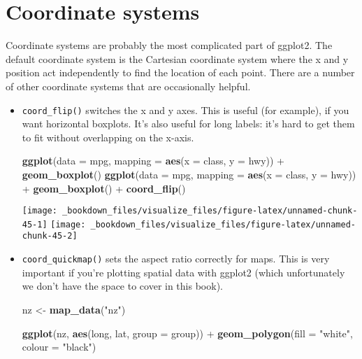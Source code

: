 \documentclass[]{book}
\newenvironment{Shaded}{\begin{snugshade}}{\end{snugshade}}
\newcommand{\KeywordTok}[1]{\textcolor[rgb]{0.13,0.29,0.53}{\textbf{{#1}}}}
\newcommand{\DataTypeTok}[1]{\textcolor[rgb]{0.13,0.29,0.53}{{#1}}}
\newcommand{\StringTok}[1]{\textcolor[rgb]{0.31,0.60,0.02}{{#1}}}
\newcommand{\NormalTok}[1]{{#1}}
\begin{document}
\section{Coordinate systems}\label{coordinate-systems}

Coordinate systems are probably the most complicated part of ggplot2.
The default coordinate system is the Cartesian coordinate system where
the x and y position act independently to find the location of each
point. There are a number of other coordinate systems that are
occasionally helpful.

\begin{itemize}
\item
  \texttt{coord\_flip()} switches the x and y axes. This is useful (for
  example), if you want horizontal boxplots. It's also useful for long
  labels: it's hard to get them to fit without overlapping on the
  x-axis.

\begin{Shaded}
\begin{Highlighting}[]
\KeywordTok{ggplot}\NormalTok{(}\DataTypeTok{data =} \NormalTok{mpg, }\DataTypeTok{mapping =} \KeywordTok{aes}\NormalTok{(}\DataTypeTok{x =} \NormalTok{class, }\DataTypeTok{y =} \NormalTok{hwy)) +}\StringTok{ }
\StringTok{  }\KeywordTok{geom_boxplot}\NormalTok{()}
\KeywordTok{ggplot}\NormalTok{(}\DataTypeTok{data =} \NormalTok{mpg, }\DataTypeTok{mapping =} \KeywordTok{aes}\NormalTok{(}\DataTypeTok{x =} \NormalTok{class, }\DataTypeTok{y =} \NormalTok{hwy)) +}\StringTok{ }
\StringTok{  }\KeywordTok{geom_boxplot}\NormalTok{() +}
\StringTok{  }\KeywordTok{coord_flip}\NormalTok{()}
\end{Highlighting}
\end{Shaded}

  \texttt{[image: \_bookdown\_files/visualize\_files/figure-latex/unnamed-chunk-45-1]}
  \texttt{[image: \_bookdown\_files/visualize\_files/figure-latex/unnamed-chunk-45-2]}
\item
  \texttt{coord\_quickmap()} sets the aspect ratio correctly for maps.
  This is very important if you're plotting spatial data with ggplot2
  (which unfortunately we don't have the space to cover in this book).

\begin{Shaded}
\begin{Highlighting}[]
\NormalTok{nz <-}\StringTok{ }\KeywordTok{map_data}\NormalTok{(}\StringTok{"nz"}\NormalTok{)}

\KeywordTok{ggplot}\NormalTok{(nz, }\KeywordTok{aes}\NormalTok{(long, lat, }\DataTypeTok{group =} \NormalTok{group)) +}
\StringTok{  }\KeywordTok{geom_polygon}\NormalTok{(}\DataTypeTok{fill =} \StringTok{"white"}\NormalTok{, }\DataTypeTok{colour =} \StringTok{"black"}\NormalTok{)}


\end{Highlighting}
\end{Shaded}
\end{itemize}
\end{document}
